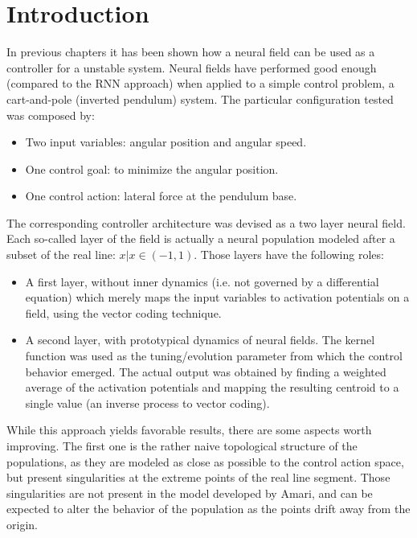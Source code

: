 \section{Introduction}
\label{sec:chp3-introduction}
In previous chapters it has been shown how a neural field can be used
as a controller for a unstable system. Neural fields have performed
good enough (compared to the RNN approach) when applied to a simple
control problem, a cart-and-pole (inverted pendulum) system. The
particular configuration tested was composed by:

\begin{itemize}
\item Two input variables: angular position and angular speed.
\item One control goal: to minimize the angular position.
\item One control action: lateral force at the pendulum base.
\end{itemize}

The corresponding controller architecture was devised as a two layer
neural field. Each so-called layer of the field is actually a neural
population modeled after a subset of the real line: $x | x \in
(-1,1)$. 
Those layers have the following roles:

\begin{itemize}
\item A first layer, without inner dynamics (i.e. not governed by a
  differential equation) which merely maps the input variables to
  activation potentials on a field, using the vector coding technique.
\item A second layer, with prototypical dynamics of neural fields. The
  kernel function was used as the tuning/evolution parameter from
  which the control behavior emerged. The actual output was obtained
  by finding a weighted average of the activation potentials and
  mapping the resulting centroid to a single value (an inverse process
  to vector coding).
\end{itemize}

While this approach yields favorable results, there are some aspects
worth improving. The first one is the rather naive topological
structure of the populations, as they are modeled as close as possible
to the control action space, but present singularities at the extreme
points of the real line segment. Those singularities are not present
in the model developed by Amari, and can be expected to alter the
behavior of the population as the points drift away from the origin.

